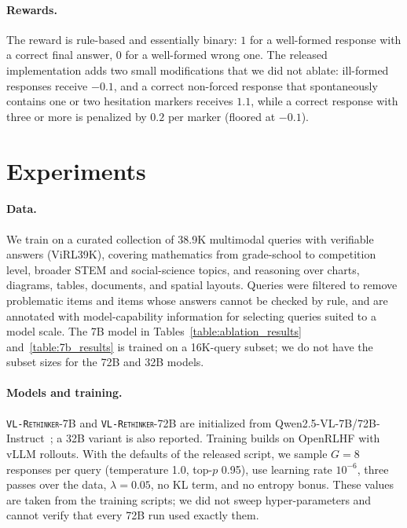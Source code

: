\documentclass{article}
\newcommand{\model}{\texttt{\textsc{VL-Rethinker}}\xspace}
\begin{document}
\paragraph{Rewards.} The reward is rule-based and essentially binary: $1$ for a well-formed response with a correct final answer, $0$ for a well-formed wrong one. The released implementation adds two small modifications that we did not ablate: ill-formed responses receive $-0.1$, and a correct non-forced response that spontaneously contains one or two hesitation markers receives $1.1$, while a correct response with three or more is penalized by $0.2$ per marker (floored at $-0.1$).



\section{Experiments}
\label{sec:exp}

\paragraph{Data.} We train on a curated collection of 38.9K multimodal queries with verifiable answers (ViRL39K), covering mathematics from grade-school to competition level, broader STEM and social-science topics, and reasoning over charts, diagrams, tables, documents, and spatial layouts. Queries were filtered to remove problematic items and items whose answers cannot be checked by rule, and are annotated with model-capability information for selecting queries suited to a model scale. The 7B model in Tables~\ref{table:ablation_results} and~\ref{table:7b_results} is trained on a 16K-query subset; we do not have the subset sizes for the 72B and 32B models.

\paragraph{Models and training.} \model-7B and \model-72B are initialized from Qwen2.5-VL-7B/72B-Instruct~\citep{qwen2_5_vl}; a 32B variant is also reported. Training builds on OpenRLHF with vLLM rollouts. With the defaults of the released script, we sample $G=8$ responses per query (temperature 1.0, top-$p$ 0.95), use learning rate $10^{-6}$, three passes over the data, $\lambda=0.05$, no KL term, and no entropy bonus. These values are taken from the training scripts; we did not sweep hyper-parameters and cannot verify that every 72B run used exactly them.
\end{document}
